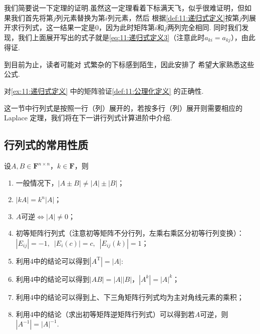 我们简要说一下定理的证明.虽然这一定理看着下标满天飞，似乎很难证明，但如果我们首先将第$j$列元素替换为第$i$列元素，然后
根据\autoref{def:11:递归式定义}按第$j$列展开求行列式，这一结果一定是0，因为此时矩阵第$i$和$j$两列完全相同.
同时我们发现，我们上面展开写出的式子就是\autoref{eq:11:递归式定义3}（注意此时$a_{ki}=a_{kj}$），由此得证.

到目前为止，读者可能对 式繁杂的下标感到陌生，因此安排了
 希望大家熟悉这些公式.
\begin{example} \label{ex:11:递归式定义2}
    对\autoref{ex:11:递归式定义} 中的矩阵验证\autoref{def:11:公理化定义} 的正确性.
\end{example}
\begin{solution}

\end{solution}

这一节中行列式是按照一行（列）展开的，若按多行（列）展开则需要相应的 Laplace 定理，我们将在下一讲行列式计算进阶中介绍.

\subsection{行列式的常用性质}
设$A,B \in \mathbf{F}^{n \times n}$，$k \in \mathbf{F}$，则
\begin{enumerate}
    \item 一般情况下，$|A \pm B| \neq |A|\pm|B|$；

    \item $|kA|=k^n|A|$；

    \item $A$可逆$\iff |A| \neq 0$；

    \item 初等矩阵行列式（注意初等矩阵不分行列，左乘右乘区分初等行列变换）：$|E_{ij}|=-1,\enspace |E_i(c)|=c,\enspace |E_{ij}(k)|=1$；

    \item 利用4中的结论可以得到$|A^\mathrm{T}|=|A|$:

    \item 利用4中的结论可以得到$|AB|=|A||B|$，$|A^k|=|A|^k$；
    
    \item 利用4中的结论可以得到上、下三角矩阵行列式均为主对角线元素的乘积；

    \item 利用4中的结论（求出初等矩阵逆矩阵行列式）可以得到若$A$可逆，则$|A^{-1}|=|A|^{-1}$.
\end{enumerate}

